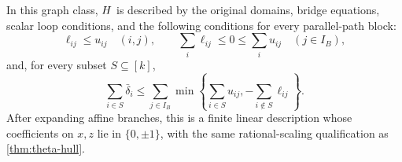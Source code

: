 \begin{theorem}\label{thm:parallel-hull}
In this graph class, $H$ is described by the original domains, bridge
equations, scalar loop conditions, and the following conditions for every
parallel-path block:
\begin{equation}\label{eq:parallel-local}
 \ell_{ij}\le u_{ij}\quad(i,j),\qquad
 \sum_i\ell_{ij}\le0\le\sum_i u_{ij}\quad(j\in I_B),
\end{equation}
and, for every subset $S\subseteq[k]$,
\begin{equation}\label{eq:parallel-subset}
 \sum_{i\in S}\bar\delta_i\le
 \sum_{j\in I_B}\min\left\{\sum_{i\in S}u_{ij},
                           -\sum_{i\notin S}\ell_{ij}\right\}.
\end{equation}
After expanding affine branches, this is a finite linear description
whose coefficients on $x,z$ lie in $\{0,\pm1\}$, with the same
rational-scaling qualification as \cref{thm:theta-hull}.
\end{theorem}
